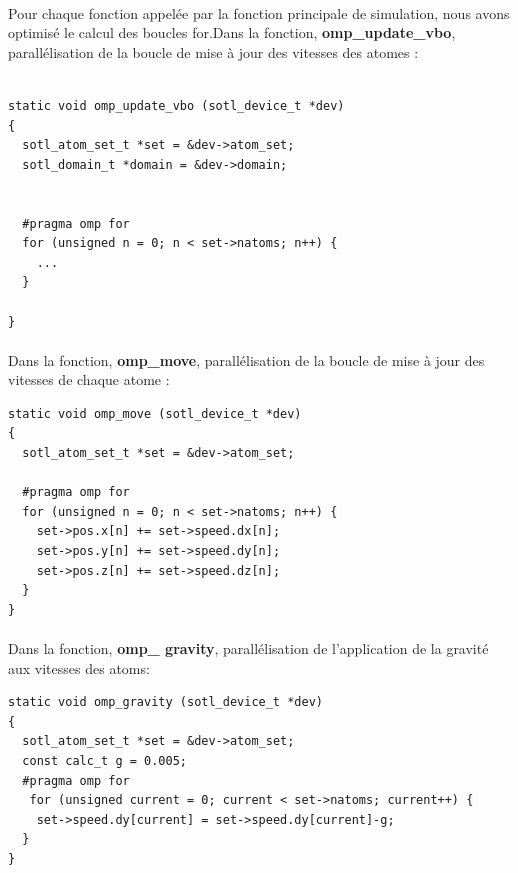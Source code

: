 \documentclass[a4paper,11pt]{report}
\begin{document}
\paragraph{}
Pour chaque fonction appelée par la fonction principale de simulation, nous avons optimisé le calcul des boucles for.Dans la fonction, \textbf{omp\_update\_vbo}, parallélisation de la boucle de mise à jour des vitesses des atomes :
\newline

\begin{lstlisting}[style=CStyle]

static void omp_update_vbo (sotl_device_t *dev)
{
  sotl_atom_set_t *set = &dev->atom_set;
  sotl_domain_t *domain = &dev->domain;

 
  #pragma omp for
  for (unsigned n = 0; n < set->natoms; n++) {
    ...
  }
  
}
\end{lstlisting}

\paragraph{}
Dans la fonction, \textbf{omp\_move}, parallélisation de la boucle de mise à jour des vitesses de chaque atome :
\newline
\begin{lstlisting}[style=CStyle]
static void omp_move (sotl_device_t *dev)
{
  sotl_atom_set_t *set = &dev->atom_set;

  #pragma omp for
  for (unsigned n = 0; n < set->natoms; n++) {
    set->pos.x[n] += set->speed.dx[n];
    set->pos.y[n] += set->speed.dy[n];
    set->pos.z[n] += set->speed.dz[n];
  }
}

\end{lstlisting}
\paragraph{}
Dans la fonction, \textbf{omp\_ gravity}, parallélisation de l'application de la gravité aux vitesses des atoms:
\newline
\begin{lstlisting}[style=CStyle]
static void omp_gravity (sotl_device_t *dev)
{
  sotl_atom_set_t *set = &dev->atom_set;
  const calc_t g = 0.005;
  #pragma omp for
   for (unsigned current = 0; current < set->natoms; current++) {
	set->speed.dy[current] = set->speed.dy[current]-g;
  }
}
\end{lstlisting}
\end{document}
